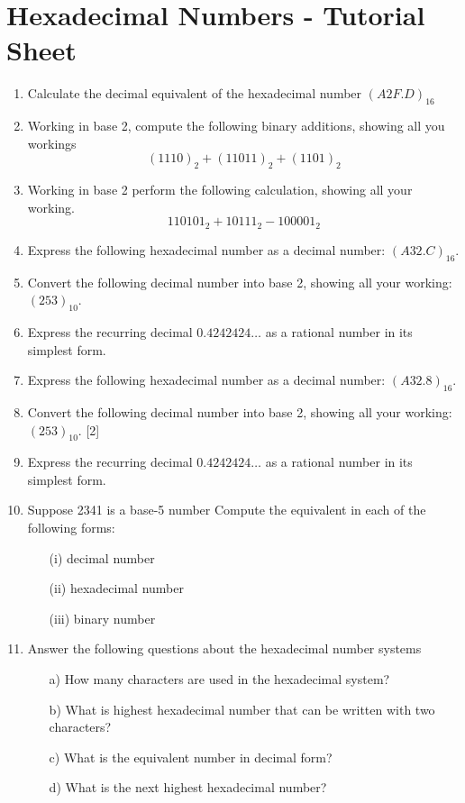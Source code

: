 \documentclass[]{article}
\begin{document}
\section*{ Hexadecimal Numbers - Tutorial Sheet}
\begin{enumerate}
\item Calculate the decimal equivalent of the hexadecimal number $(A2F.D)_{16}$
\item Working in base 2, compute the following binary additions, showing all you workings
\[(1110)_2 + (11011)_2 + (1101)_2 \]


\item Working in base 2 perform the following calculation, showing all your working. 
\[110101_2 + 10111_2 - 100001_2\]
\item Express the following hexadecimal number as a decimal number: $(A32.C)_{16}$.

\item Convert the following decimal number into base 2, showing all your working:
$(253)_{10}$. 
\item Express the recurring decimal $0.4242424\ldots$
 as a rational number in its simplest
form.
\item  Express the following hexadecimal number as a decimal number: $(A32.8)_{16}$.
\item Convert the following decimal number into base 2, showing all your working:
$(253)_{10}$. [2]
\item  Express the recurring decimal $0.4242424\ldots$
as a rational number in its simplest
form. 
\item Suppose 2341 is a base-5 number
Compute the equivalent in each of the following forms:
\begin{itemize}
\item[(i)] decimal number
\item[(ii)] hexadecimal number
\item[(iii)] binary number
\end{itemize}


\item Answer the following questions about the hexadecimal number systems
\begin{itemize}
\item[a)] How many characters are used in the hexadecimal system?
\item[b)] What is highest hexadecimal number that can be written with two characters? \item[c)] What is the equivalent number in decimal form?
\item[d)] What is the next highest hexadecimal number?
\end{itemize}



\end{enumerate}
\end{document}
